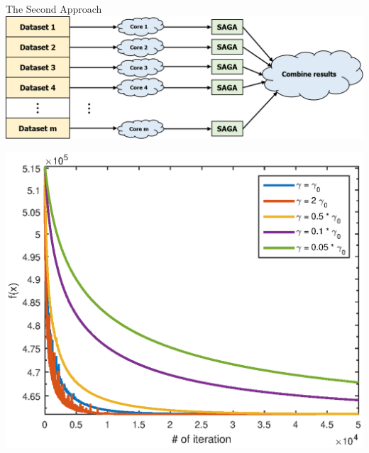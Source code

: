 \begin{frame}{The Second Approach}
	\centering
	\includegraphics[scale=0.35]{Picture2.png}
	
	\centering
	\includegraphics[scale=0.5]{distributed3.eps} 
\end{frame}

